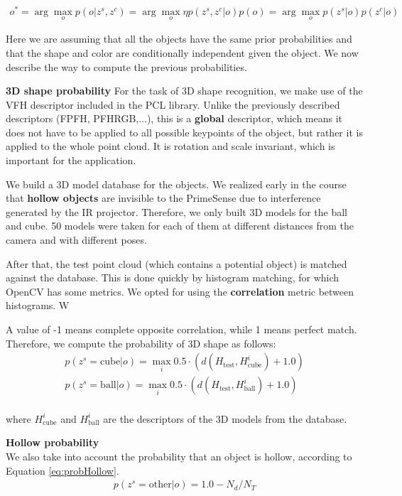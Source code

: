 \begin{align}
\label{eq:obj_map}
o^* = \arg\max_o p(o|z^s, z^c) = \arg\max_o \eta p(z^s, z^c|o) p(o) = \arg\max_o p(z^s|o)p(z^c|o)
\end{align}

Here we are assuming that all the objects have the same prior probabilities and that the shape and color are conditionally independent given the object. 
We now describe the way to compute the previous probabilities.

\textbf{3D shape probability}
For the task of 3D shape recognition, we make use of the VFH descriptor included in the PCL library. Unlike the previously described descriptors (FPFH, PFHRGB,...), this is a \textbf{global} descriptor, which means it does not have to be applied to all possible keypoints of the object, but rather it is applied to the whole point cloud. It is rotation and scale invariant, which is important for the application. 

We build a 3D model database for the objects. We realized early in the course that \textbf{hollow objects} are invisible to the PrimeSense due to interference generated by the IR projector. Therefore, we only built 3D models for the ball and cube. 50 models were taken for each of them at different distances from the camera and with different poses. 

After that, the test point cloud (which contains a potential object) is matched against the database. This is done quickly by histogram matching, for which OpenCV has some metrics. We opted for using the \textbf{correlation} metric between histograms. W

A value of -1 means complete opposite correlation, while 1 means perfect match. Therefore, we compute the probability of 3D shape as follows:
\begin{align}
p(z^s = \text{cube} | o) = \max_i 0.5\cdot(d(H_{\text{test}}, H_{\text{cube}}^i) + 1.0) \\
p(z^s = \text{ball} | o) = \max_i 0.5\cdot(d(H_{\text{test}}, H_{\text{ball}}^i) + 1.0) \\
\end{align}

where $H_{\text{cube}}^i$ and $H_{\text{ball}}^i$ are the descriptors of the 3D models from the database.

\textbf{Hollow probability}\\
We also take into account the probability that an object is hollow, according to Equation \ref{eq:probHollow}.
\begin{align}
\label{eq:probHollow}
p(z^s = \text{other} | o) = 1.0 - N_d/N_T
\end{align}


